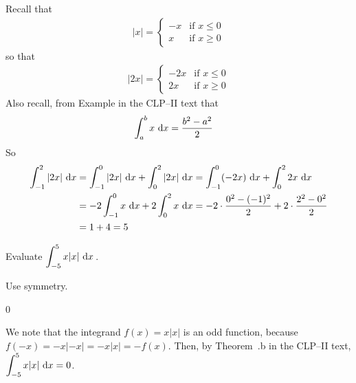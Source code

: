 \begin{solution}
Recall that
\begin{align*}
|x|=\begin{cases} -x &\text{if $x\le 0$}\\
                   x &\text{if $x\ge 0$}
    \end{cases}
\end{align*}
so that
\begin{align*}
|2x|=\begin{cases} -2x &\text{if $x\le 0$}\\
                    2x &\text{if $x\ge 0$}
    \end{cases}
\end{align*}
Also recall, from  Example  in the
CLP--II text that
\begin{align*}
\int_a^b x\ \mathrm{d}x&=\frac{b^2-a^2}{2}
\end{align*}
So
\begin{align*}
\int_{-1}^2 |2x|\ \mathrm{d}x
&=\int_{-1}^0 |2x|\ \mathrm{d}x+\int_0^2 |2x|\ \mathrm{d}x
=\int_{-1}^0 (-2x)\ \mathrm{d}x+\int_0^2 2x\ \mathrm{d}x \\
&= -2\int_{-1}^0 x\ \mathrm{d}x+2\int_0^2 x\ \mathrm{d}x
=-2\cdot\frac{0^2-(-1)^2}{2} +2\cdot\frac{2^2-0^2}{2} \\
&=1+4=5
\end{align*}


\end{solution}



\begin{question}
Evaluate $\displaystyle\int_{-5}^5 x|x|\ \dee{x}$\,.
\end{question}
\begin{hint} Use symmetry.
\end{hint}
\begin{answer} 0
\end{answer}
\begin{solution}
We note that the integrand $f(x)=x|x|$ is an odd function, because $f(-x)=-x|-x|=-x|x|=-f(x)$. Then, by Theorem~.b in the CLP--II text,
 $\displaystyle\int_{-5}^5 x|x| \ \dee{x}=0$.
\end{solution}

